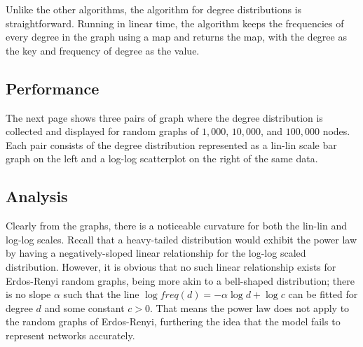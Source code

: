 \documentclass{article}
\begin{document}
    \noindent Unlike the other algorithms, the algorithm for degree 
    distributions is straightforward. Running in linear time, the algorithm
    keeps the frequencies of every degree in the graph using a map and returns
    the map, with the degree as the key and frequency of degree as the value.
\subsection{Performance}
    The next page shows three pairs of graph where the degree distribution is
    collected and displayed for random graphs of $1,000$, $10,000$, and 
    $100,000$ nodes. Each pair consists of the degree distribution represented
    as a lin-lin scale bar graph on the left and a log-log scatterplot on the
    right of the same data. 
\subsection{Analysis}
    Clearly from the graphs, there is a noticeable curvature for both the
    lin-lin and log-log scales. Recall that a heavy-tailed distribution would
    exhibit the power law by having a negatively-sloped linear relationship 
    for the log-log scaled distribution. However, it is obvious that no such 
    linear relationship exists for Erdos-Renyi random graphs, being more akin
    to a bell-shaped distribution; there is no slope $\alpha$ such that the 
    line $\log{freq(d)} = -\alpha\log{d} + \log{c}$ can be fitted for degree $d$
    and some constant $c > 0$. That means the power law does not apply to 
    the random graphs of Erdos-Renyi, furthering the idea that the model fails
    to represent networks accurately. 
\end{document}
